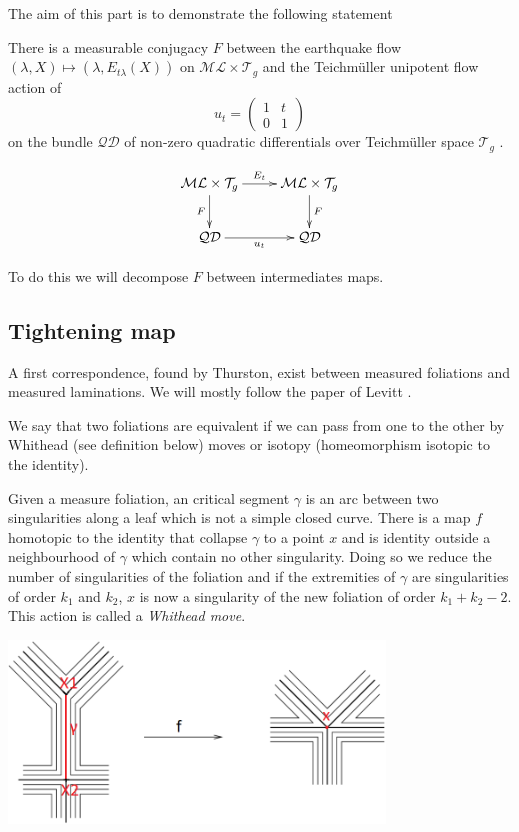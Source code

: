 The aim of this part is to demonstrate the following statement

\begin{thm}
\label{MirThm}
There is a measurable conjugacy $F$ between the earthquake flow $(\lambda , X) \mapsto (\lambda, E_{t \lambda}(X))$ on $\mathcal{ML}\times \mathcal{T}_g $ and the Teichmüller unipotent flow action of \[
u_t = \begin{pmatrix} 1 & t \\ 0 & 1 \end{pmatrix}
\]
on the bundle $\mathcal{QD}$ of non-zero quadratic differentials over Teichmüller space $\mathcal{T}_g$ .
\end{thm}

\[
\xymatrix{
  \mathcal{ML}\times \mathcal{T}_g  \ar[r]^{E_t} \ar[d]_F  & \mathcal{ML}\times \mathcal{T}_g \ar[d]^F \\
   \mathcal{QD} \ar[r]_{u_t} & \mathcal{QD}
 }
\]

To do this we will decompose $F$ between intermediates maps.

\subsection{Tightening map}

A first correspondence, found by Thurston, exist between measured foliations and measured laminations. We will mostly follow the paper of Levitt \cite{levittfoliations}.

\begin{dfnt}
We say that two foliations are equivalent if we can pass from one to the other by Whithead (see definition below) moves or isotopy (homeomorphism isotopic to the identity).
\end{dfnt}


\begin{dfnt}
Given a measure foliation, an critical segment $\gamma$ is an arc between two singularities along a leaf which is not a simple closed curve.
There is a map $f$ homotopic to the identity that collapse $\gamma$ to a point $x$ and is identity outside a neighbourhood of $\gamma$ which contain no other singularity. Doing so we reduce the number of singularities of the foliation and if the extremities of $\gamma$ are singularities of order $k_1$ and $k_2$, $x$ is now a singularity of the new foliation of order $k_1+k_2-2$.
This action is called a \emph{Whithead move}.
\end{dfnt}


\begin{center}
\includegraphics[width=10cm]{Image/Whitehead-move-collapsing-or-creating-an-arc-joining-two-singular-points.png}
\end{center}

